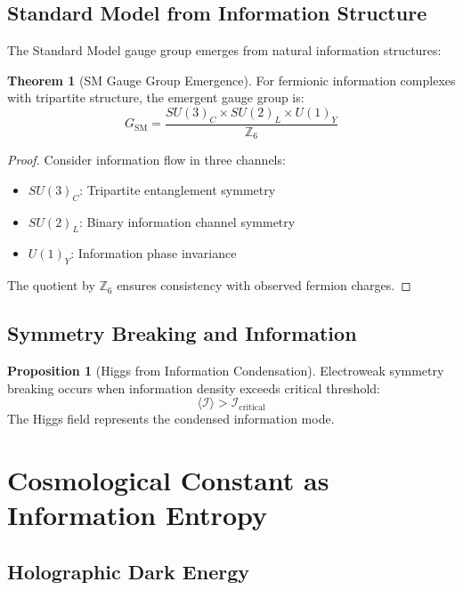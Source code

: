 \documentclass[11pt,a4paper]{article}
\theoremstyle{definition}
\newtheorem{theorem}{Theorem}[section]
\newtheorem{proposition}{Proposition}[section]
\begin{document}
\subsection{Standard Model from Information Structure}

The Standard Model gauge group emerges from natural information structures:

\begin{theorem}[SM Gauge Group Emergence]
For fermionic information complexes with tripartite structure, the emergent gauge group is:
\begin{equation}
G_{\text{SM}} = \frac{SU(3)_C \times SU(2)_L \times U(1)_Y}{\mathbb{Z}_6}
\end{equation}
\end{theorem}

\begin{proof}
Consider information flow in three channels:
\begin{itemize}
\item $SU(3)_C$: Tripartite entanglement symmetry
\item $SU(2)_L$: Binary information channel symmetry
\item $U(1)_Y$: Information phase invariance
\end{itemize}
The quotient by $\mathbb{Z}_6$ ensures consistency with observed fermion charges.
\end{proof}

\subsection{Symmetry Breaking and Information}

\begin{proposition}[Higgs from Information Condensation]
Electroweak symmetry breaking occurs when information density exceeds critical threshold:
\[\langle\mathcal{I}\rangle > \mathcal{I}_{\text{critical}}\]
The Higgs field represents the condensed information mode.
\end{proposition}

\section{Cosmological Constant as Information Entropy}

\subsection{Holographic Dark Energy}
\end{document}

